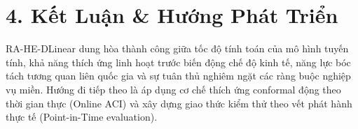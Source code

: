 \section*{4. Kết Luận \& Hướng Phát Triển}
RA-HE-DLinear dung hòa thành công giữa tốc độ tính toán của mô hình tuyến tính, khả năng thích ứng linh hoạt trước biến động chế độ kinh tế, năng lực bóc tách tương quan liên quốc gia và sự tuân thủ nghiêm ngặt các ràng buộc nghiệp vụ miền. Hướng đi tiếp theo là áp dụng cơ chế thích ứng conformal động theo thời gian thực (Online ACI) và xây dựng giao thức kiểm thử theo vết phát hành thực tế (Point-in-Time evaluation).
